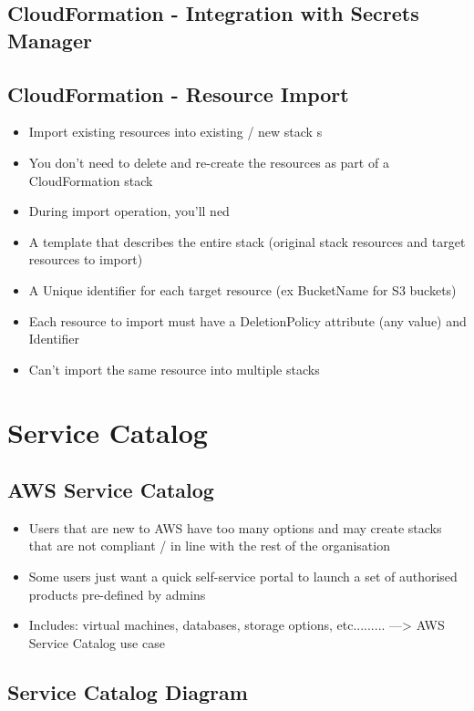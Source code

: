 \subsection{CloudFormation - Integration with Secrets Manager}

\subsection{CloudFormation - Resource Import}
\begin{itemize}
    \item Import existing resources into existing / new stack s
    \item You don't need to delete and re-create the resources as part of a CloudFormation stack
    \item During import operation, you'll ned
    \item A template that describes the entire stack (original stack resources and target resources to import)
    \item A Unique identifier for each target resource (ex BucketName for S3 buckets)
    \item Each resource to import must have a DeletionPolicy attribute (any value) and Identifier
    \item Can't import the same resource into multiple stacks
\end{itemize}


\section{Service Catalog}

\subsection{AWS Service Catalog}
\begin{itemize}
    \item Users that are new to AWS have too many options and may create stacks that are not compliant / in line with the rest of the organisation
    \item Some users just want a quick self-service portal to launch a set of authorised products pre-defined by admins
    \item Includes: virtual machines, databases, storage options, etc.........
    ---> AWS Service Catalog use case
\end{itemize}

\subsection{Service Catalog Diagram}

